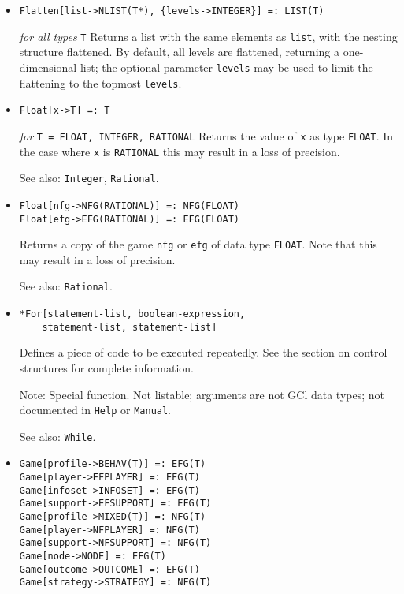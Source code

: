 \begin{itemize}
\item{}
\protect \large \begin{verbatim}
Flatten[list->NLIST(T*), {levels->INTEGER}] =: LIST(T)
\end{verbatim} \normalsize

{\it for all types} {\tt T}
\bd
Returns a list with the same elements as \verb+list+, with the nesting
structure flattened.  By default, all levels are flattened, returning
a one-dimensional list; the optional parameter \verb+levels+ may be
used to limit the flattening to the topmost \verb+levels+.
\ed

\item{}
\protect \large \begin{verbatim}
Float[x->T] =: T
\end{verbatim} \normalsize

{\it for} {\tt T = FLOAT, INTEGER, RATIONAL}
\bd
Returns the value of \verb+x+ as type \verb+FLOAT+.
In the case where \verb+x+ is \verb+RATIONAL+ this may result in a loss
of precision.
\item [See also:] \verb+Integer+, \verb+Rational+.
\ed

\item{}
\protect \large \begin{verbatim}
Float[nfg->NFG(RATIONAL)] =: NFG(FLOAT)
Float[efg->EFG(RATIONAL)] =: EFG(FLOAT)
\end{verbatim} \normalsize

\bd
Returns a copy of the game \verb+nfg+ or \verb+efg+ of data type 
\verb+FLOAT+. Note that this may result in a loss of precision.  
\item [See also:] \verb+Rational+.
\ed

\item{}
\protect \large \begin{verbatim}
*For[statement-list, boolean-expression, 
    statement-list, statement-list]
\end{verbatim}\normalsize

\bd
Defines a piece of code to be executed repeatedly.  See the section
on control structures for complete information.
\item [Note:] Special function.  Not listable; arguments are not GCl
data types; not documented in \verb+Help+ or \verb+Manual+.  
\item
[See also:] \verb+While+.
\ed


\item{}
\protect \large \begin{verbatim}
Game[profile->BEHAV(T)] =: EFG(T)
Game[player->EFPLAYER] =: EFG(T)
Game[infoset->INFOSET] =: EFG(T)
Game[support->EFSUPPORT] =: EFG(T)
Game[profile->MIXED(T)] =: NFG(T)
Game[player->NFPLAYER] =: NFG(T)
Game[support->NFSUPPORT] =: NFG(T)
Game[node->NODE] =: EFG(T)
Game[outcome->OUTCOME] =: EFG(T)
Game[strategy->STRATEGY] =: NFG(T)
\end{verbatim} \normalsize


\end{itemize}
